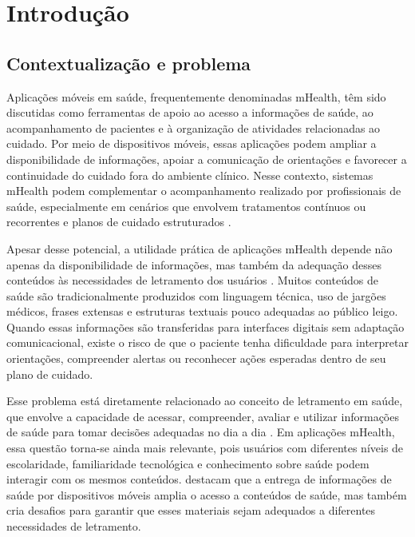 \chapter{Introdução}
\label{cap:introducao}

\section{Contextualização e problema}
\label{sec:contextualizacao-problema}

Aplicações móveis em saúde, frequentemente denominadas mHealth, têm sido discutidas como ferramentas de apoio ao acesso a informações de saúde, ao acompanhamento de pacientes e à organização de atividades relacionadas ao cuidado. Por meio de dispositivos móveis, essas aplicações podem ampliar a disponibilidade de informações, apoiar a comunicação de orientações e favorecer a continuidade do cuidado fora do ambiente clínico. Nesse contexto, sistemas mHealth podem complementar o acompanhamento realizado por profissionais de saúde, especialmente em cenários que envolvem tratamentos contínuos ou recorrentes e planos de cuidado estruturados \cite{who2011mhealth,emerson2022mhealth,niemiec2022takere}.

Apesar desse potencial, a utilidade prática de aplicações mHealth depende não apenas da disponibilidade de informações, mas também da adequação desses conteúdos às necessidades de letramento dos usuários \cite{emerson2022mhealth}. Muitos conteúdos de saúde são tradicionalmente produzidos com linguagem técnica, uso de jargões médicos, frases extensas e estruturas textuais pouco adequadas ao público leigo. Quando essas informações são transferidas para interfaces digitais sem adaptação comunicacional, existe o risco de que o paciente tenha dificuldade para interpretar orientações, compreender alertas ou reconhecer ações esperadas dentro de seu plano de cuidado.

Esse problema está diretamente relacionado ao conceito de letramento em saúde, que envolve a capacidade de acessar, compreender, avaliar e utilizar informações de saúde para tomar decisões adequadas no dia a dia \cite{who2025healthliteracy}. Em aplicações mHealth, essa questão torna-se ainda mais relevante, pois usuários com diferentes níveis de escolaridade, familiaridade tecnológica e conhecimento sobre saúde podem interagir com os mesmos conteúdos.  destacam que a entrega de informações de saúde por dispositivos móveis amplia o acesso a conteúdos de saúde, mas também cria desafios para garantir que esses materiais sejam adequados a diferentes necessidades de letramento.

